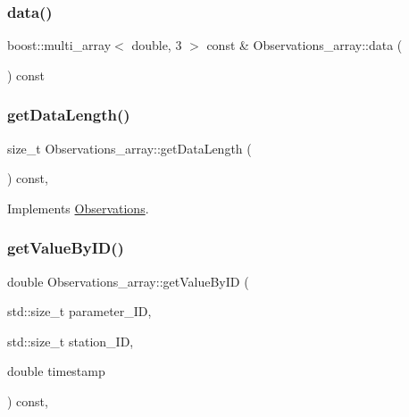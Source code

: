 \subsubsection{\texorpdfstring{data()}{data()}}
{\footnotesize\ttfamily boost\+::multi\+\_\+array$<$ double, 3 $>$ const  \& Observations\+\_\+array\+::data (\begin{DoxyParamCaption}{ }\end{DoxyParamCaption}) const}

\mbox{\label{class_observations__array_ae535b742be4ea895117da607fbe7c702}} 
\subsubsection{\texorpdfstring{get\+Data\+Length()}{getDataLength()}}
{\footnotesize\ttfamily size\+\_\+t Observations\+\_\+array\+::get\+Data\+Length (\begin{DoxyParamCaption}{ }\end{DoxyParamCaption}) const\hspace{0.3cm}{\ttfamily [override]}, {\ttfamily [virtual]}}



Implements \mbox{\hyperlink{class_observations_a3ad688dc4ef6dc6adabe212808fd32a9}{Observations}}.

\mbox{\label{class_observations__array_a42449c7be492f7df27d74c370c8e719f}} 
\subsubsection{\texorpdfstring{get\+Value\+By\+I\+D()}{getValueByID()}}
{\footnotesize\ttfamily double Observations\+\_\+array\+::get\+Value\+By\+ID (\begin{DoxyParamCaption}\item[{std\+::size\+\_\+t}]{parameter\+\_\+\+ID,  }\item[{std\+::size\+\_\+t}]{station\+\_\+\+ID,  }\item[{double}]{timestamp }\end{DoxyParamCaption}) const\hspace{0.3cm}{\ttfamily [override]}, {\ttfamily [virtual]}}

